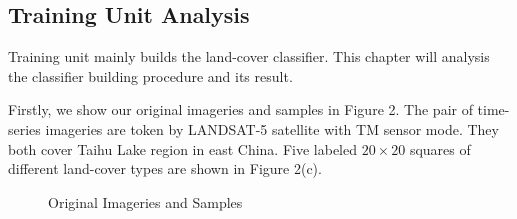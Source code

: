 \documentclass{elsart}
\begin{document}
\subsection{Training Unit Analysis}
Training unit mainly builds the land-cover classifier.
This chapter will analysis the classifier building procedure and its result.
\par
Firstly, we show our original imageries and samples in Figure 2.
The pair of time-series imageries are token by LANDSAT-5 satellite with TM sensor mode.
They both cover Taihu Lake region in east China.
Five labeled $20\times20$ squares of different land-cover types are shown in Figure 2(c).  
\begin{figure}[H]
\centering
{}
\caption{Original Imageries and Samples}
\label{Fig.lable}
\end{figure}
\par
\end{document}
